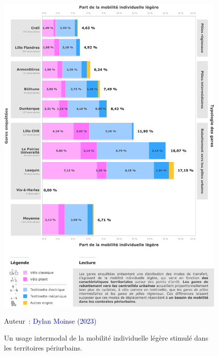 \begin{refsegment}
    \begin{figure}[h!]\vspace*{4pt}
        \caption{Un usage intermodal de la mobilité individuelle légère stimulé dans les territoires périurbains.}
        \label{fig-chap4:part-modale-urbain-periurbain}
        \centerline{\includegraphics[width=1\columnwidth]{src/Figures/Chap-4/FR_Part_modale_MIL_gares.pdf}}
        \vspace{5pt}
        \begin{flushright}\scriptsize{
        Auteur~: \textcolor{blue}{Dylan Moinse (2023)}
        }\end{flushright}
    \end{figure}


\end{refsegment}
